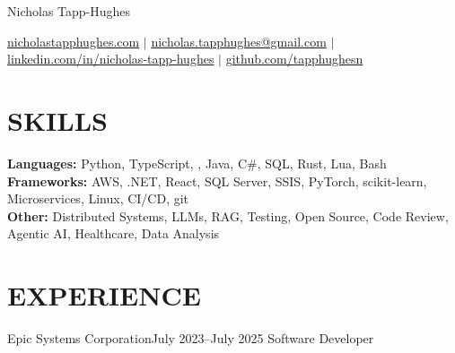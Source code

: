 \documentclass[a4paper,11pt]{article}
\begin{document}

{\basictitle \Huge Nicholas Tapp-Hughes}


\vspace{2mm}
\footnotesize{
\href{https://www.nicholastapphughes.com}{nicholastapphughes.com} $|$
\hspace{-2mm}
\href{mailto:nicholas.tapphughes@gmail.com}{
    nicholas.tapphughes@gmail.com} $|$
\hspace{-2mm}
\href{https://www.linkedin.com/in/nicholas-tapp-hughes/}{
    linkedin.com/in/nicholas-tapp-hughes} $|$
\hspace{-2mm}
\href{https://github.com/tapphughesn}{
    github.com/tapphughesn}
}



\vspace{-4mm}
\section{SKILLS}
\vspace{-2mm}
  \small{
    \textbf{Languages:}{ Python, TypeScript, \CC, Java, C\#, SQL, Rust, Lua, Bash} \\
    \textbf{Frameworks:}{ AWS, .NET, React, SQL Server, SSIS, PyTorch, scikit-learn, Microservices, Linux, CI/CD, git } \\
    \textbf{Other:}{ Distributed Systems, LLMs, RAG, Testing, Open Source, Code Review, Agentic AI, Healthcare, Data Analysis}
  }


\vspace{-4mm}
\section{EXPERIENCE}
  \resumeSubHeadingListStart

    \vspace{-1mm}
    \resumeSubheading
      {Epic Systems Corporation}{July 2023--July 2025}
      {Software Developer}{}
      \vspace{-1mm}
      
\end{document}

